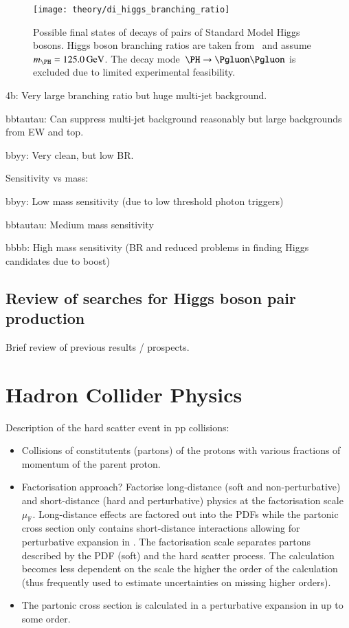 \begin{figure}[htbp]
  \centering
  \texttt{[image: theory/di\_higgs\_branching\_ratio]}
  \caption{Possible final states of decays of pairs of Standard Model
    Higgs bosons. Higgs boson branching ratios are taken
    from~\cite{deFlorian:2016spz} and
    assume~$m_{\PH} = \SI{125.0}{\GeV}$. The decay
    mode~$\PH \ra \Pgluon\Pgluon$ is excluded due to limited
    experimental feasibility.}
  \label{fig:hh_branching_ratios}
\end{figure}

4b: Very large branching ratio but huge multi-jet background.

bbtautau: Can suppress multi-jet background reasonably but large
backgrounds from EW and top.

bbyy: Very clean, but low BR.



Sensitivity vs mass:

bbyy: Low mass sensitivity (due to low threshold photon triggers)

bbtautau: Medium mass sensitivity

bbbb: High mass sensitivity (BR and reduced problems in finding Higgs
candidates due to boost)


\subsection{Review of searches for Higgs boson pair production}

Brief review of previous results / prospects.


\section{Hadron Collider Physics}


Description of the hard scatter event in pp collisions:
\begin{itemize}
\item Collisions of constitutents (partons) of the protons with
  various fractions of momentum of the parent proton.

\item Factorisation approach? Factorise long-distance (soft and
  non-perturbative) and short-distance (hard and perturbative) physics
  at the factorisation scale $\mu_\text{F}$. Long-distance effects are
  factored out into the PDFs while the partonic cross section only
  contains short-distance interactions allowing for perturbative
  expansion in \alphas. The factorisation scale separates partons
  described by the PDF (soft) and the hard scatter process. The
  calculation becomes less dependent on the scale the higher the order
  of the calculation (thus frequently used to estimate uncertainties
  on missing higher orders).

\item The partonic cross section is calculated in a perturbative
  expansion in \alphas up to some order.
\end{itemize}

